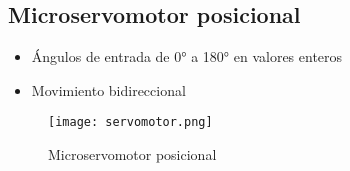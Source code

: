 
\subsection*{Microservomotor posicional}
\begin{itemize}
	\item Ángulos de entrada de 0° a 180° en valores enteros
	\item Movimiento bidireccional
\end{itemize}

\begin{figure}[htb]
	\centering
	\texttt{[image: servomotor.png]}
	\caption{Microservomotor posicional}
\end{figure}
